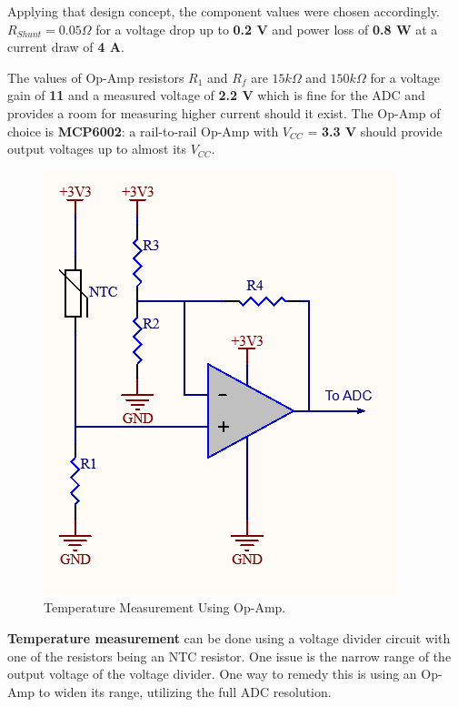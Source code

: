 Applying that design concept, the component values were chosen accordingly. \textbf{$R_{Shunt} = 0.05 \Omega$} for a voltage drop up to \textbf{0.2 V} and power loss of \textbf{0.8 W} at a current draw of \textbf{4 A}. 

\newpage

The values of Op-Amp resistors \textbf{$R_1$} and \textbf{$R_f$} are \textbf{$15 k\Omega$} and \textbf{$150 k\Omega$} for a voltage gain of \textbf{11} and a measured voltage of \textbf{2.2 V} which is fine for the ADC and provides a room for measuring higher current should it exist. The Op-Amp of choice is \textbf{MCP6002}: a rail-to-rail Op-Amp with $V_{CC}$ = \textbf{3.3 V} should provide output voltages up to almost its $V_{CC}$. 

\begin{figure}[h!]
    \centering
    \includegraphics[scale=0.65]{./Figures/HW/Temperature-Measurement.png}
    \caption{Temperature Measurement Using Op-Amp.\cite{op_amp_temperature}}
    \label{fig:hw-temp-mes}
\end{figure}

\textbf{Temperature measurement} 
can be done using a voltage divider circuit with one of the resistors being an NTC resistor. One issue is the narrow range of the output voltage of the voltage divider. One way to remedy this is using an Op-Amp to widen its range, utilizing the full ADC resolution. \cite{op_amp_temperature} 


